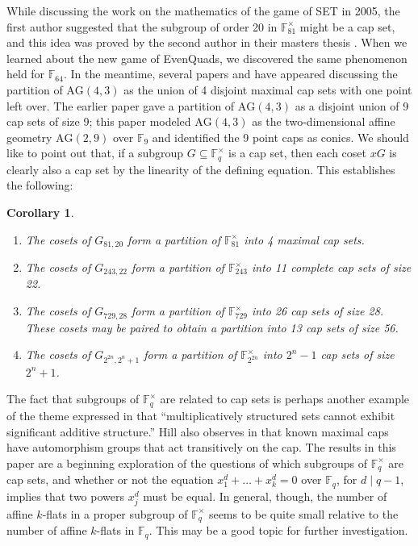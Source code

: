 \documentclass[12pt]{amsart}
\newtheorem{cor}[thm]{Corollary}
\theoremstyle{definition}
\begin{document}
While discussing the work \cite{DavisMaclagan2003} on the mathematics
of the game of SET in 2005, the first author suggested that the
subgroup of order 20 in $\mathbb{F}_{81}^\times$ might be a cap set,
and this idea was proved by the second author in their masters thesis
\cite{Mills2006}. When we learned about the new game of EvenQuads, we
discovered the same phenomenon held for $\mathbb{F}_{64}$.  In the
meantime, several papers \cite{FollettKalailetal2014} and
\cite{AwanFrechetteLiMcMahon2022} have appeared discussing the
partition of $\text{AG}(4,3)$ as the union of 4 disjoint maximal cap
sets with one point left over. The earlier paper \cite{Tucker2007}
gave a partition of $\text{AG}(4,3)$ as a disjoint union of 9 cap sets
of size 9; this paper modeled $\text{AG}(4,3)$ as the two-dimensional
affine geometry $\text{AG}(2,9)$ over $\mathbb{F}_9$ and identified
the 9 point caps as conics. We should like to point out that, if a
subgroup $G\subseteq \mathbb{F}_{q}^\times$ is a cap set, then each
coset $xG$ is clearly also a cap set by the linearity of the defining
equation. This establishes the following:

\begin{cor}
  \begin{enumerate}
  \item The cosets of $G_{81,20}$ form a partition of
    $\mathbb{F}_{81}^\times$ into 4 maximal cap sets.
  \item The cosets of $G_{243,22}$ form a partition of
    $\mathbb{F}_{243}^\times$ into 11 complete cap sets of size 22.
  \item The cosets of $G_{729,28}$ form a partition of
    $\mathbb{F}_{729}^\times$ into 26 cap sets of size 28. These
    cosets may be paired to obtain a partition into 13 cap sets of
    size 56.
  \item The cosets of $G_{2^{2n},2^n+1}$
    form a partition of $\mathbb{F}_{2^{2n}}^\times$ into $2^n-1$ cap
    sets of size $2^n+1$.
  \end{enumerate}
\end{cor}

The fact that subgroups of $\mathbb{F}_q^\times$ are related to cap
sets is perhaps another example of the theme expressed in
\cite{Kalmynin2025} that ``multiplicatively structured sets cannot
exhibit significant additive structure.''  Hill also observes in
\cite{Hill1976} that known maximal caps have automorphism groups that
act transitively on the cap. The results in this paper are a beginning
exploration of the questions of which subgroups of
$\mathbb{F}_q^\times$ are cap sets, and whether or not the equation
$x_1^d+\dots +x_k^d=0$ over $\mathbb{F}_q$, for $d\mid q-1$, implies
that two powers $x_j^d$ must be equal. In general, though, the number
of affine $k$-flats in a proper subgroup of $\mathbb{F}_{q}^\times$
seems to be quite small relative to the number of affine $k$-flats in
$\mathbb{F}_{q}$.  This may be a good topic for further investigation.
\end{document}
